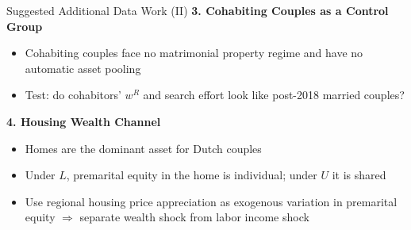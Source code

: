 \documentclass[aspectratio=169, 11pt]{beamer}
\newcommand{\wR}{w^R}
\begin{document}
\begin{frame}{Suggested Additional Data Work (II)}
\textbf{3. Cohabiting Couples as a Control Group}
\begin{itemize}
  \item Cohabiting couples face no matrimonial property regime and have no automatic asset pooling
  \item Test: do cohabitors' $\wR$ and search effort look like post-2018 married couples?
\end{itemize}
\vspace{1.5em}
\textbf{4. Housing Wealth Channel}
\begin{itemize}
  \item Homes are the dominant asset for Dutch couples
  \item Under $L$, premarital equity in the home is individual; under $U$ it is shared
  \item Use regional housing price appreciation as exogenous variation in premarital equity $\Rightarrow$ separate wealth shock from labor income shock
\end{itemize}
\end{frame}
\end{document}
